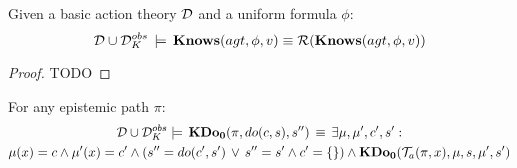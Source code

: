 \begin{thmext}
[{{[}{{[}{\ref{thm:Reg_KnowsO}}]}]}] Given a basic action theory
$\mathcal{D}$ and a uniform formula $\phi$:\[
\mathcal{D}\cup\mathcal{D}_{K}^{obs}\,\models\,\mathbf{Knows}(agt,\phi,v)\equiv\mathcal{R}(\mathbf{Knows}(agt,\phi,v))\]

\end{thmext}
\begin{proof}
TODO 
\end{proof}
\begin{lemma}
\label{lem:TrnA_works}For any epistemic path $\pi$:\begin{multline*}
\mathcal{D}\cup\mathcal{D}_{K}^{obs}\models\,\mathbf{KDo_{0}}(\pi,do(c,s),s'')\,\equiv\,\exists\mu,\mu',c',s':\\
\mu(x)=c\wedge\mu'(x)=c'\wedge\left(s''=do(c',s')\,\vee\, s''=s'\wedge c'=\{\}\right)\wedge\mathbf{KDo_{0}}(\mathcal{T}_{a}(\pi,x),\mu,s,\mu',s')\end{multline*}

\end{lemma}
